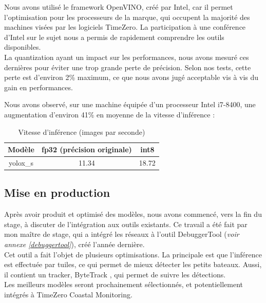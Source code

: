 Nous avons utilisé le framework OpenVINO, créé par Intel, car il permet l'optimisation pour
les processeurs de la marque, qui occupent la majorité des machines visées par les logiciels TimeZero.
La participation à une conférence d'Intel sur le sujet nous a permis de rapidement
comprendre les outils disponibles. \\

La quantization ayant un impact sur les performances, nous avons mesuré ces dernières pour
éviter une trop grande perte de précision. Selon nos tests, cette perte est d'environ 2\% maximum,
ce que nous avons jugé acceptable vis à vis du gain en performances.

Nous avons observé, sur une machine équipée d'un processeur Intel i7-8400, une augmentation d'environ
41\% en moyenne de la vitesse d'inférence : \\

\begin{table}[!h]
    \caption{Vitesse d'inférence (images par seconde)}
    \begin{center}
    \begin{tabular}{c c c}
        \hline
        Modèle & fp32 (précision originale) & int8 \\
        \hline
        yolox\_s & 11.34 & 18.72 \\
    \end{tabular}
\end{center}
\end{table}

\pagebreak

\subsection{Mise en production}

Après avoir produit et optimisé des modèles, nous avons commencé, vers la fin du stage,
à discuter de l'intégration aux outils existants. Ce travail a été fait par mon maître de stage,
qui a intégré les réseaux à l'outil DebuggerTool (\textit{voir annexe \ref{debuggertool}}),
créé l'année dernière.\\

Cet outil a fait l'objet de plusieurs optimisations. La principale est que l'inférence est effectuée par tuiles,
ce qui permet de mieux détecter les petits bateaux. Aussi, il contient un tracker, ByteTrack \cite{Zhang_Sun_Jiang_Yu_Weng_Yuan_Luo_Liu_Wang_2022},
qui permet de suivre les détections.\\

Les meilleurs modèles seront prochainement sélectionnés,
et potentiellement intégrés à TimeZero Coastal Monitoring.

